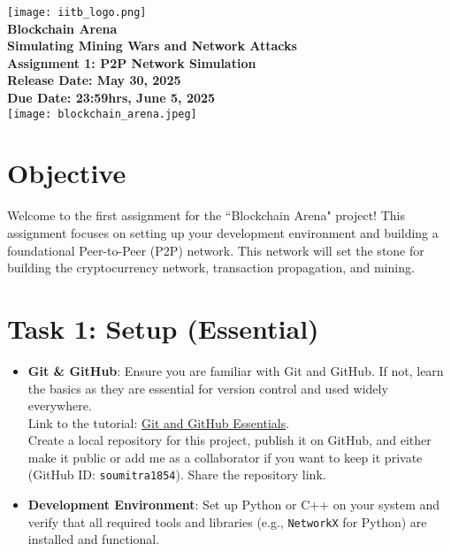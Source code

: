 \documentclass[12pt]{extarticle}
\begin{document}
\begin{titlepage}
    \begin{center}
        \texttt{[image: iitb\_logo.png]}\\[1.5cm]
        {\LARGE \bfseries Blockchain Arena}\\
        \vspace{0.5cm}
        {\Large \bfseries Simulating Mining Wars and Network Attacks}\\
        \vspace{0.5cm}
        {\Large \bfseries Assignment 1: P2P Network Simulation}\\
        \vspace{1.5cm}
        {\Large \bf Release Date: May 30, 2025}\\
        \vspace{0.5cm}
        {\Large \bf Due Date: 23:59hrs, June 5, 2025}\\
        \vspace{3cm}
        \texttt{[image: blockchain\_arena.jpeg]}\\[1.5cm]
    \end{center}
\end{titlepage}

\section*{Objective}
Welcome to the first assignment for the ``Blockchain Arena" project! This assignment focuses on setting up your development environment and building a foundational Peer-to-Peer (P2P) network. This network will set the stone for building the cryptocurrency network, transaction propagation, and mining.

\section*{Task 1: Setup (Essential)}
\begin{itemize}
    \item \textbf{Git \& GitHub}: Ensure you are familiar with Git and GitHub. If not, learn the basics as they are essential for version control and used widely everywhere.\\Link to the tutorial: \href{https://youtu.be/tRZGeaHPoaw?si=KTOgtqin7e2d0rI8}{Git and GitHub Essentials}.\\ Create a local repository for this project, publish it on GitHub, and either make it public or add me as a collaborator if you want to keep it private (GitHub ID: \texttt{soumitra1854}). Share the repository link.
    \item \textbf{Development Environment}: Set up Python or C++ on your system and verify that all required tools and libraries (e.g., \texttt{NetworkX} for Python) are installed and functional.
\end{itemize}
\end{document}
